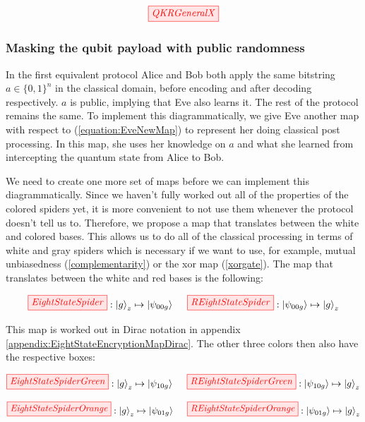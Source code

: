 \documentclass[]{article}
\begin{document}
\begin{equation}
\label{equation:QKRGeneral}
	\tikzfig{QKRGeneralX}
\end{equation}


\subsubsection{Masking the qubit payload with public randomness}
\label{section:maskingqubitpubrand}
In the first equivalent protocol Alice and Bob both apply the same bitstring $a \in \{0,1\}^n$ in the classical domain, before encoding and after decoding respectively. $a$ is public, implying that Eve also learns it. The rest of the protocol remains the same. To implement this diagrammatically, we give Eve another map with respect to (\ref{equation:EveNewMap}) to represent her doing classical post processing. In this map, she uses her knowledge on $a$ and what she learned from intercepting the quantum state from Alice to Bob.

We need to create one more set of maps before we can implement this diagrammatically. Since we haven't fully worked out all of the properties of the colored spiders yet, it is more convenient to not use them whenever the protocol doesn't tell us to. Therefore, we propose a map that translates between the white and colored bases. This allows us to do all of the classical processing in terms of white and gray spiders which is necessary if we want to use, for example, mutual unbiasedness (\ref{complementarity}) or the xor map (\ref{xorgate}). The map that translates between the white and red bases is the following:

\begin{equation}
\label{equation:EightStateSpider}
\tikzfig{EightStateSpider} :
\ket{g}_z \mapsto \ket{\psi_{00g}} ~~~~ \tikzfig{REightStateSpider} :
\ket{\psi_{00g}} \mapsto \ket{g}_z
\end{equation}

This map is worked out in Dirac notation in appendix \ref{appendix:EightStateEncryptionMapDirac}. The other three colors then also have the respective boxes:

\begin{equation}
\label{equation:EightStateSpiderGreen}
\tikzfig{EightStateSpiderGreen} :
\ket{g}_z \mapsto \ket{\psi_{10g}} ~~~~ \tikzfig{REightStateSpiderGreen} :
\ket{\psi_{10g}} \mapsto \ket{g}_z
\end{equation}

\begin{equation}
\label{equation:EightStateSpiderOrange}
\tikzfig{EightStateSpiderOrange} :
\ket{g}_z \mapsto \ket{\psi_{01g}} ~~~~ \tikzfig{REightStateSpiderOrange} :
\ket{\psi_{01g}} \mapsto \ket{g}_z
\end{equation}
\end{document}
